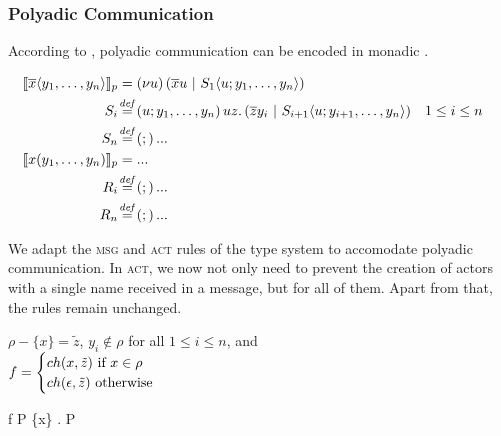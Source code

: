 \subsubsection{Polyadic Communication}

According to \cite{agha_algebraic_2004},
polyadic communication can be encoded in monadic \actorpicalc.

\begin{align*}
  \encPolyAP{\asnd{x}{y_1, \ldots, y_n}}
  &= \anew*{u}{\amsnd{x}{u} \apar \ains{S_1}{u}{y_1, \ldots, y_n}}
  \\
  \adef*{S_i}{u}{y_1, \ldots, y_n}
    {\amrcv{u}{z} . \parens{\amsnd{z}{y_i} \apar \ains{S_{i+1}}{u}{y_{i+1}, \ldots, y_n}}}
    && 1 \leq i \leq n
  \\
  \adef*{S_n}{}{}{...}
  \\
  \encPolyAP{\arcv{x}{y_1, \ldots, y_n}}
  &= ...
  \\
  \adef*{R_i}{}{}{...}
  \\
  \adef*{R_n}{}{}{...}
\end{align*}


We adapt the \textsc{msg} and \textsc{act} rules of the type system
to accomodate polyadic communication.
In \textsc{act}, we now not only need to prevent the creation of actors
with a single name received in a message, but for all of them.
Apart from that, the rules remain unchanged.

  {\begin{varwidth}{8cm}
    $\rho - \{x\} = \tilde{z}$, $y_i \notin \rho$ for all $1 \leq i \leq n$, and \\
    $ f =
      \begin{cases}
        ch(x, \tilde{z}) \text{ if } x \in \rho \\
        ch(\epsilon, \tilde{z}) \text{ otherwise }
      \end{cases} $
   \end{varwidth}}
  {\judgement
    {\rho}
    {f}
    {P}}
  {\judgement
    {\{x\} \cup {}}
    {}
    { . P}}
